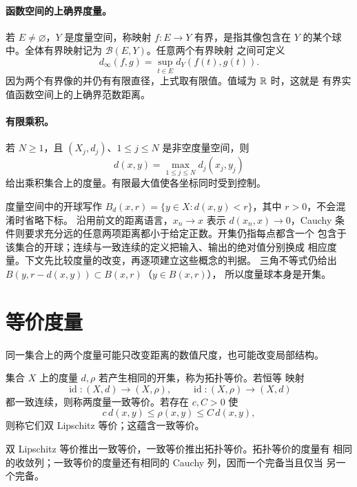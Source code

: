 \paragraph{函数空间的上确界度量。}
若 \(E\ne\varnothing\)，\(Y\) 是度量空间，称映射 \(f:E\to Y\) 有界，是指其像包含在 \(Y\)
的某个球中。全体有界映射记为 \(\mathcal B(E,Y)\)。任意两个有界映射
之间可定义
\[
 d_\infty(f,g)=\sup_{t\in E}d_Y(f(t),g(t)).
\]
因为两个有界像的并仍有有限直径，上式取有限值。值域为 \(\mathbb{R}\) 时，这就是
有界实值函数空间上的上确界范数距离。

\paragraph{有限乘积。}
若 \(N\ge1\)，且 \((X_j,d_j)\)、\(1\le j\le N\) 是非空度量空间，则
\[
 d(x,y)=\max_{1\le j\le N}d_j(x_j,y_j)
\]
给出乘积集合上的度量。有限最大值使各坐标同时受到控制。

度量空间中的开球写作
\(B_d(x,r)=\{y\in X:d(x,y)<r\}\)，其中 \(r>0\)，不会混淆时省略下标。
沿用前文的距离语言，\(x_n\to x\) 表示 \(d(x_n,x)\to0\)，Cauchy
条件则要求充分远的任意两项距离都小于给定正数。开集仍指每点都含一个
包含于该集合的开球；连续与一致连续的定义把输入、输出的绝对值分别换成
相应度量。下文先比较度量的改变，再逐项建立这些概念的判据。
三角不等式仍给出 \(B(y,r-d(x,y))\subset B(x,r)\)（\(y\in B(x,r)\)），
所以度量球本身是开集。

\section{等价度量}

同一集合上的两个度量可能只改变距离的数值尺度，也可能改变局部结构。

\begin{definition}[拓扑等价与一致等价]
集合 \(X\) 上的度量 \(d,\rho\) 若产生相同的开集，称为拓扑等价。若恒等
映射
\[
 \operatorname{id}:(X,d)\to(X,\rho),\qquad
 \operatorname{id}:(X,\rho)\to(X,d)
\]
都一致连续，则称两度量一致等价。若存在 \(c,C>0\) 使
\[
 c\,d(x,y)\le\rho(x,y)\le C\,d(x,y),
\]
则称它们双 Lipschitz 等价；这蕴含一致等价。
\end{definition}

\begin{proposition}
\label{prop:equivalent-metrics-hierarchy}
双 Lipschitz 等价推出一致等价，一致等价推出拓扑等价。拓扑等价的度量有
相同的收敛列；一致等价的度量还有相同的 Cauchy 列，因而一个完备当且仅当
另一个完备。
\end{proposition}

